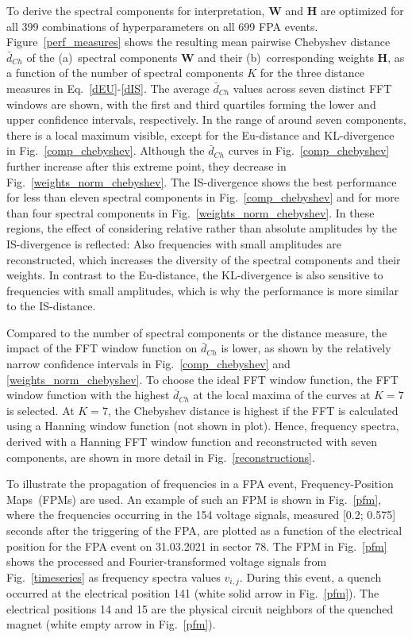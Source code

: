 \documentclass[lettersize,journal]{IEEEtran}
\begin{document}
To derive the spectral components for interpretation, $\mathbf{W}$ and $\mathbf{H}$ are optimized for all 399 combinations of hyperparameters on all 699 FPA events.
Figure~\ref{perf_measures} shows the resulting mean pairwise Chebyshev distance $\bar{d}_{Ch}$ of the (a)~spectral components $\mathbf{W}$ and their (b)~corresponding weights $\mathbf{H}$, as a function of the number of spectral components $K$ for the three distance measures in Eq.~\ref{dEU}-\ref{dIS}. 
The average $\bar{d}_{Ch}$ values across seven distinct FFT windows are shown, with the first and third quartiles forming the lower and upper confidence intervals, respectively.
In the range of around seven components, there is a local maximum visible, except for the Eu-distance and KL-divergence in Fig.~\ref{comp_chebyshev}. 
Although the $\bar{d}_{Ch}$ curves in Fig.~\ref{comp_chebyshev} further increase after this extreme point, they decrease in Fig.~\ref{weights_norm_chebyshev}.
The IS-divergence shows the best performance for less than eleven spectral components in Fig.~\ref{comp_chebyshev} and for more than four spectral components in Fig.~\ref{weights_norm_chebyshev}.
In these regions, the effect of considering relative rather than absolute amplitudes by the IS-divergence is reflected: Also frequencies with small amplitudes are reconstructed, which increases the diversity of the spectral components and their weights.
In contrast to the Eu-distance, the KL-divergence is also sensitive to frequencies with small amplitudes, which is why the performance is more similar to the IS-distance.

Compared to the number of spectral components or the distance measure, the impact of the FFT window function on $\bar{d}_{Ch}$ is lower, as shown by the relatively narrow confidence intervals in Fig.~\ref{comp_chebyshev} and \ref{weights_norm_chebyshev}.
To choose the ideal FFT window function, the FFT window function with the highest $\bar{d}_{Ch}$ at the local maxima of the curves at $K=7$ is selected.
At $K=7$, the Chebyshev distance is highest if the FFT is calculated using a Hanning window function (not shown in plot).
Hence, frequency spectra, derived with a Hanning FFT window function and reconstructed with seven components, are shown in more detail in Fig.~\ref{reconstructions}.

To illustrate the propagation of frequencies in a FPA event, Frequency-Position Maps~(FPMs) are used.
An example of such an FPM is shown in Fig.~\ref{pfm}, where the frequencies occurring in the 154 voltage signals, measured [0.2; 0.575] seconds after the triggering of the FPA, are plotted as a function of the electrical position for the FPA event on 31.03.2021 in sector 78.
The FPM in Fig.~\ref{pfm} shows the processed and Fourier-transformed voltage signals from Fig.~\ref{timeseries} as frequency spectra values $v_{i,j}$.
During this event, a quench occurred at the electrical position 141 (white solid arrow in Fig.~\ref{pfm}). The electrical positions 14 and 15 are the physical circuit neighbors of the quenched magnet (white empty arrow in Fig.~\ref{pfm}). 
\end{document}
